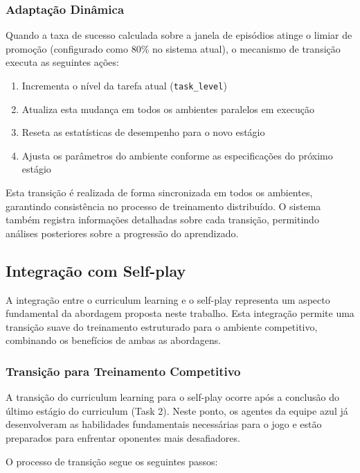 \subsubsection{Adaptação Dinâmica}

Quando a taxa de sucesso calculada sobre a janela de episódios atinge o limiar de promoção (configurado como 80\% no sistema atual), o mecanismo de transição executa as seguintes ações:

\begin{enumerate}
    \item Incrementa o nível da tarefa atual (\texttt{task\_level})
    \item Atualiza esta mudança em todos os ambientes paralelos em execução
    \item Reseta as estatísticas de desempenho para o novo estágio
    \item Ajusta os parâmetros do ambiente conforme as especificações do próximo estágio
\end{enumerate}

Esta transição é realizada de forma sincronizada em todos os ambientes, garantindo consistência no processo de treinamento distribuído. O sistema também registra informações detalhadas sobre cada transição, permitindo análises posteriores sobre a progressão do aprendizado.

\subsection{Integração com Self-play}
\label{subsec:integracao_selfplay}

A integração entre o curriculum learning e o self-play representa um aspecto fundamental da abordagem proposta neste trabalho. Esta integração permite uma transição suave do treinamento estruturado para o ambiente competitivo, combinando os benefícios de ambas as abordagens.

\subsubsection{Transição para Treinamento Competitivo}

A transição do curriculum learning para o self-play ocorre após a conclusão do último estágio do curriculum (Task 2). Neste ponto, os agentes da equipe azul já desenvolveram as habilidades fundamentais necessárias para o jogo e estão preparados para enfrentar oponentes mais desafiadores.

O processo de transição segue os seguintes passos:

